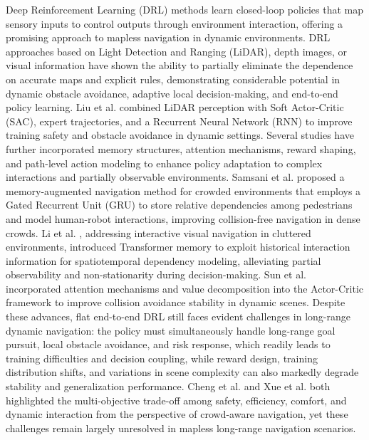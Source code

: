 Deep Reinforcement Learning (DRL) methods learn closed-loop policies that map sensory inputs to control outputs through environment interaction, offering a promising approach to mapless navigation in dynamic environments. DRL approaches based on Light Detection and Ranging (LiDAR), depth images, or visual information have shown the ability to partially eliminate the dependence on accurate maps and explicit rules, demonstrating considerable potential in dynamic obstacle avoidance, adaptive local decision-making, and end-to-end policy learning. Liu et al. \cite{6} combined LiDAR perception with Soft Actor-Critic (SAC), expert trajectories, and a Recurrent Neural Network (RNN) to improve training safety and obstacle avoidance in dynamic settings. Several studies have further incorporated memory structures, attention mechanisms, reward shaping, and path-level action modeling to enhance policy adaptation to complex interactions and partially observable environments. Samsani et al. \cite{7} proposed a memory-augmented navigation method for crowded environments that employs a Gated Recurrent Unit (GRU) to store relative dependencies among pedestrians and model human-robot interactions, improving collision-free navigation in dense crowds. Li et al. \cite{8}, addressing interactive visual navigation in cluttered environments, introduced Transformer memory to exploit historical interaction information for spatiotemporal dependency modeling, alleviating partial observability and non-stationarity during decision-making. Sun et al. \cite{9} incorporated attention mechanisms and value decomposition into the Actor-Critic framework to improve collision avoidance stability in dynamic scenes. Despite these advances, flat end-to-end DRL still faces evident challenges in long-range dynamic navigation: the policy must simultaneously handle long-range goal pursuit, local obstacle avoidance, and risk response, which readily leads to training difficulties and decision coupling, while reward design, training distribution shifts, and variations in scene complexity can also markedly degrade stability and generalization performance. Cheng et al. \cite{10} and Xue et al. \cite{11} both highlighted the multi-objective trade-off among safety, efficiency, comfort, and dynamic interaction from the perspective of crowd-aware navigation, yet these challenges remain largely unresolved in mapless long-range navigation scenarios.

